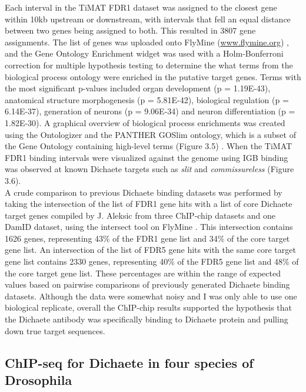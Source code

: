 Each interval in the TiMAT FDR1 dataset was assigned to the closest gene within 10kb upstream or downstream, with intervals that fell an equal distance between two genes being assigned to both. This resulted in 3807 gene assignments. The list of genes was uploaded onto FlyMine (\url{www.flymine.org}) \citep{lyne_flymine:_2007}, and the Gene Ontology Enrichment widget was used with a Holm-Bonferroni correction for multiple hypothesis testing to determine the what terms from the biological process ontology were enriched in the putative target genes. Terms with the most significant p-values included organ development (p = 1.19E-43), anatomical structure morphogenesis (p = 5.81E-42), biological regulation (p = 6.14E-37), generation of neurons (p = 9.06E-34) and neuron differentiation (p = 1.82E-30). A graphical overview of biological process enrichments was created using the Ontologizer and the PANTHER GOSlim ontology, which is a subset of the Gene Ontology containing high-level terms (Figure 3.5) \citep{bauer_ontologizer_2008}. When the TiMAT FDR1 binding intervals were visualized against the genome using IGB \cite{nicol_integrated_2009} binding was observed at known Dichaete targets such as \emph{slit} and \emph{commissureless} (Figure 3.6).\\

A crude comparison to previous Dichaete binding datasets was performed by taking the intersection of the list of FDR1 gene hits with a list of core Dichaete target genes compiled by J. Aleksic from three ChIP-chip datasets and one DamID dataset, using the intersect tool on FlyMine \citep{aleksic_role_2013,lyne_flymine:_2007}. This intersection contains 1626 genes, representing 43\% of the FDR1 gene list and 34\% of the core target gene list. An intersection of the list of FDR5 gene hits with the same core target gene list contains 2330 genes, representing 40\% of the FDR5 gene list and 48\% of the core target gene list. These percentages are within the range of expected values based on pairwise comparisons of previously generated Dichaete binding datasets. Although the data were somewhat noisy and I was only able to use one biological replicate, overall the ChIP-chip results supported the hypothesis that the Dichaete antibody was specifically binding to Dichaete protein and pulling down true target sequences.

\subsection{ChIP-seq for Dichaete in four species of Drosophila}

